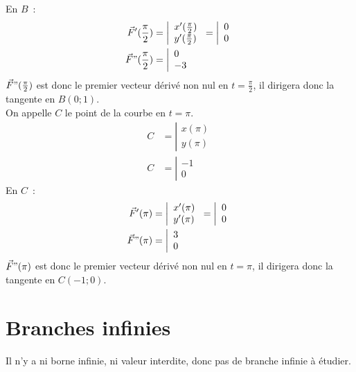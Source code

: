 \documentclass{article}
\begin{document}
En $B$~:
\begin{align*}
        \vec{F}'(\frac{\pi}{2})&=\left|\begin{array}{l}
                x'(\frac{\pi}{2})\\y'(\frac{\pi}{2})
        \end{array}\right.
        =          \left|\begin{array}{l}
                0\\0
        \end{array}\right.\\
        \vec{F}"(\frac{\pi}{2})&=\left|\begin{array}{l}
                 0\\-3
        \end{array}\right.
\end{align*}
$\vec{F}"(\frac{\pi}{2})$ est donc le premier vecteur dérivé non nul en $t=\frac{\pi}{2}$, il dirigera donc la tangente en $B(0;1)$.\\
On appelle $C$ le point de la courbe en $t=\pi$.
\begin{align*}
        C&=\left|\begin{array}{l}x(\pi)\\y(\pi)\end{array}\right.\\
                C&=\left|\begin{array}{l}-1\\0\end{array}\right.
\end{align*}
En $C$~:
\begin{align*}
        \vec{F}'(\pi)&=\left|\begin{array}{l}
                x'(\pi)\\y'(\pi)
        \end{array}\right.
        =          \left|\begin{array}{l}
                0\\0
        \end{array}\right.\\
        \vec{F}"(\pi)&=\left|\begin{array}{l}
                 3\\0
        \end{array}\right.
\end{align*}
$\vec{F}"(\pi)$ est donc le premier vecteur dérivé non nul en $t=\pi$, il dirigera donc la tangente en $C(-1;0)$.\\
\section{Branches infinies}
Il n'y a ni borne infinie, ni valeur interdite, donc pas de branche infinie à étudier.
\end{document}
